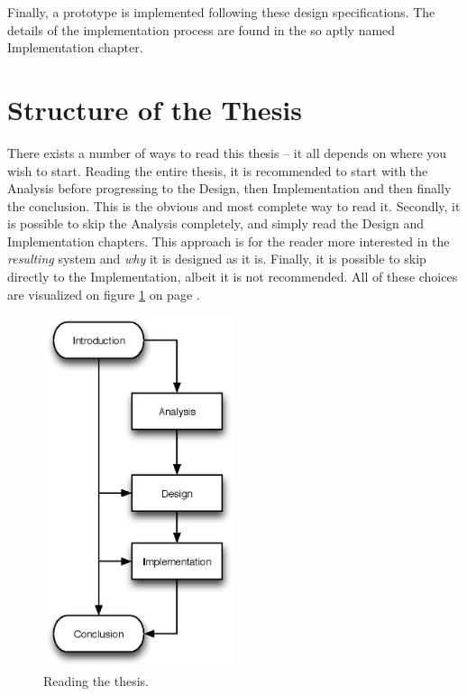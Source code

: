 		Finally, a prototype is implemented following these design specifications. The details of the implementation process are found in the so aptly named Implementation chapter.


	\section{Structure of the Thesis}
		There exists a number of ways to read this thesis -- it all depends on where you wish to start. Reading the entire thesis, it is recommended to start with the Analysis before progressing to the Design, then Implementation and then finally the conclusion. This is the obvious and most complete way to read it. Secondly, it is possible to skip the Analysis completely, and simply read the Design and Implementation chapters. This approach is for the reader more interested in the \emph{resulting} system and \emph{why} it is designed as it is. Finally, it is possible to skip directly to the Implementation, albeit it is not recommended. All of these choices are visualized on figure \ref{fig:reading:the:thesis} on page \pageref{fig:reading:the:thesis}.

		\begin{figure}[!htb]
			\centering
			\includegraphics[width=0.5\textwidth]{figures/intro/reading.eps}
			\caption{Reading the thesis.}
			\label{fig:reading:the:thesis}
		\end{figure}



